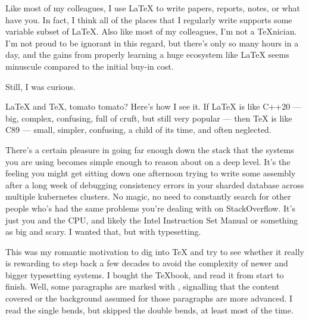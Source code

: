 \usemodule[memos][
    themecolor=cyan,
    layout=moderate,
    hdrstyle=foemarginalt,
    fontstyle=ss,
    fontsize=10pt,
    lineheight=1.75\bodyfontsize, 
    ]
\start
\language[en]
\startsectionlevel[title={Expanding TeX's \letterbackslash{}newif},reference={expanding-texs-newif}]


\startsectionlevel[title={Introduction},reference={introduction}]

Like most of my colleagues, I use LaTeX to write papers, reports, notes,
or what have you. In fact, I think all of the places that I regularly
write supports some variable subset of LaTeX. Also like most of my
colleagues, I'm not a TeXnician. I'm not proud to be ignorant in this
regard, but there's only so many hours in a day, and the gains from
properly learning a huge ecosystem like LaTeX seems minuscule compared
to the initial buy-in cost.

Still, I was curious.

LaTeX and TeX, tomato tomato? Here's how I see it. If LaTeX is like
C++20 --- big, complex, confusing, full of cruft, but still very popular
--- then TeX is like C89 --- small,
simpler,
confusing, a child of its time, and often neglected.

There's a certain pleasure in going far enough down the stack that the
systems you are using becomes simple enough to reason about on a deep
level. It's the feeling you might get sitting down one afternoon trying
to write some assembly after a long week of debugging consistency errors
in your sharded database across multiple kubernetes
clusters.
No magic, no need to constantly search for other people who's had the
same problems you're dealing with on StackOverflow. It's just you and
the CPU, and likely the Intel Instruction Set Manual or something as big
and scary. I wanted that, but with typesetting.

This was my romantic motivation to dig into TeX and try to see whether
it really is rewarding to step back a few decades to avoid the
complexity of newer and bigger typesetting systems. I bought the
TeXbook, and read it from start to finish. Well, some paragraphs are
marked with , signalling that the content
covered or the background assumed for those paragraphs are more
advanced. I read the single bends, but skipped the double bends, at
least most of the time.

